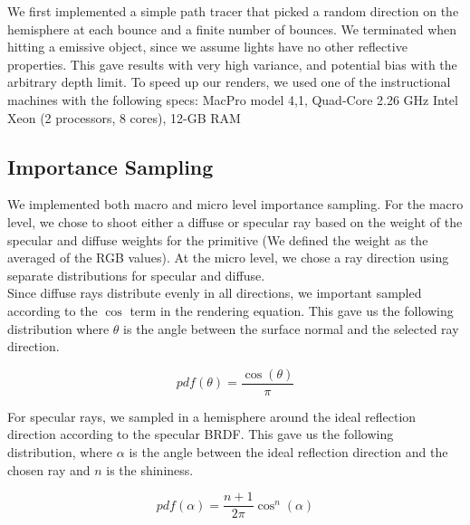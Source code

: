 \documentclass[11pt]{article}
\begin{document}
We first implemented a simple path tracer that picked a random direction on the hemisphere at each bounce and a finite number of bounces. We terminated when hitting a emissive object, since we assume lights have no other reflective properties. This gave results with very high variance, and potential bias with the arbitrary depth limit. To speed up our renders, we used one of the instructional machines with the following specs: MacPro model 4,1, Quad-Core 2.26 GHz Intel Xeon (2 processors, 8 cores), 12-GB RAM

\subsection{Importance Sampling}

We implemented both macro and micro level importance sampling. For the macro level, we chose to shoot either a diffuse or specular ray based on the weight of the specular and diffuse weights for the primitive (We defined the weight as the averaged of the RGB values). At the micro level, we chose a ray direction using separate distributions for specular and diffuse.\\

Since diffuse rays distribute evenly in all directions, we important sampled according to the $\cos$ term in the rendering equation. This gave us the following distribution where $\theta$ is the angle between the surface normal and the selected ray direction.

\begin{equation}
	pdf(\theta) = \frac{\cos(\theta)}{\pi}
\end{equation}

For specular rays, we sampled in a hemisphere around the ideal reflection direction according to the specular BRDF. This gave us the following distribution, where $\alpha$ is the angle between the ideal reflection direction and the chosen ray and $n$ is the shininess.

\begin{equation}
	pdf(\alpha) = \frac{n+1}{2\pi}\cos^{n}(\alpha)
\end{equation}
\end{document}
